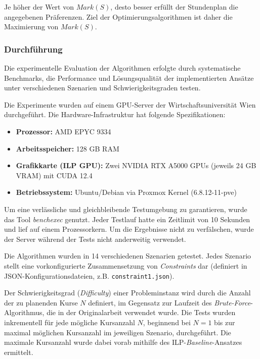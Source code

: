 Je höher der Wert von \(Mark(S)\), desto besser erfüllt der Stundenplan die angegebenen Präferenzen. Ziel der Optimierungsalgorithmen ist daher die Maximierung von \(Mark(S)\).


\subsubsection{Durchführung}

Die experimentelle Evaluation der Algorithmen erfolgte durch systematische Benchmarks, die Performance und Lösungsqualität der implementierten Ansätze unter verschiedenen Szenarien und Schwierigkeitsgraden testen.

Die Experimente wurden auf einem GPU-Server der Wirtschaftsuniversität Wien durchgeführt. Die Hardware-Infrastruktur hat folgende Spezifikationen:

\begin{itemize}
  \item \textbf{Prozessor:} AMD EPYC 9334
  \item \textbf{Arbeitsspeicher:} 128 GB RAM
  \item \textbf{Grafikkarte (ILP GPU):} Zwei NVIDIA RTX A5000 GPUs (jeweils 24 GB VRAM) mit CUDA 12.4
  \item \textbf{Betriebssystem:} Ubuntu/Debian via Proxmox Kernel (6.8.12-11-pve)
\end{itemize}

Um eine verlässliche und gleichbleibende Testumgebung zu garantieren, wurde das Tool \textit{benchexec} genutzt. Jeder Testlauf hatte ein Zeitlimit von 10 Sekunden und lief auf einem Prozessorkern. Um die Ergebnisse nicht zu verfälschen, wurde der Server während der Tests nicht anderweitig verwendet.

Die Algorithmen wurden in 14 verschiedenen Szenarien getestet. Jedes Szenario stellt eine vorkonfigurierte Zusammensetzung von \textit{Constraints} dar (definiert in JSON-Konfigurationsdateien, z.B. \texttt{constraint1.json}).

Der Schwierigkeitsgrad (\textit{Difficulty}) einer Probleminstanz wird durch die Anzahl der zu planenden Kurse $N$ definiert, im Gegensatz zur Laufzeit des \textit{Brute-Force}-Algorithmus, die in der Originalarbeit verwendet wurde. Die Tests wurden inkrementell für jede mögliche Kursanzahl $N$, beginnend bei $N=1$ bis zur maximal möglichen Kursanzahl im jeweiligen Szenario, durchgeführt. Die maximale Kursanzahl wurde dabei vorab mithilfe des ILP-\textit{Baseline}-Ansatzes ermittelt.

